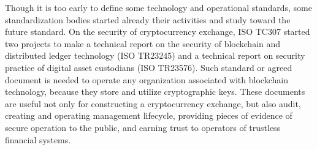 Though it is too early to define some technology and operational standards,
some standardization bodies started already their activities and study toward the future standard.
On the security of cryptocurrency exchange, ISO TC307 started two projects to make a technical report on the security of blockchain and distributed ledger technology (ISO TR23245) and a technical report on security practice of digital asset custodians (ISO TR23576).
Such standard or agreed document is needed to operate any organization
associated with blockchain technology, because they store and utilize cryptographic keys. These documents are useful not only for constructing
a cryptocurrency exchange, but also audit, creating and operating management lifecycle, providing pieces of evidence of secure operation to the public, and
earning trust to operators of trustless financial systems.
